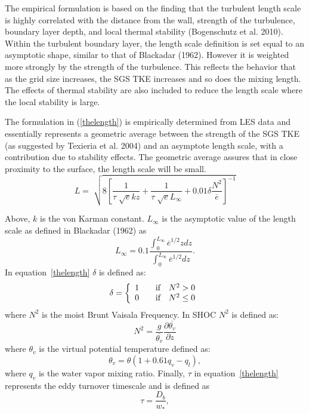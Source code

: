 \documentclass[12pt,titlepage]{article}
\numberwithin{equation}{section}
\begin{document}
The empirical formulation is based on the finding that the turbulent length scale is highly correlated with the distance from the wall, strength of the turbulence, boundary layer depth, and local thermal stability (Bogenschutz et al. 2010).  Within the turbulent boundary layer, the length scale definition is set equal to an asymptotic shape, similar to that of Blackadar (1962).  However it is weighted more strongly by the strength of the turbulence.  This reflects the behavior that as the grid size increases, the SGS TKE increases and so does the mixing length.  The effects of thermal stability are also included to reduce the length scale where the local stability is large.  

The formulation in (\ref{thelength}) is empirically determined from LES data and essentially represents a geometric average between the strength of the SGS TKE (as suggested by Texieria et al. 2004) and an asymptote length scale, with a contribution due to stability effects.  The geometric average assures that in close proximity to the surface, the length scale will be small.  
%
\begin{equation}
  L=\sqrt[]{8\left[\frac{1}{\tau\sqrt[]{e}kz}+\frac{1}{\tau\sqrt[]{e}L_{\infty}}+0.01\delta\frac{N^{2}}{\overline{e}}\right]^{-1}}
  \label{thelength}
\end{equation}

Above, $k$ is the von Karman constant.  $L_{\infty}$ is the asymptotic value of the length scale as defined in Blackadar (1962) as
%
 \begin{equation}
  L_{\infty}=0.1\frac{\int_{0}^{L_{\infty}}\overline{e}^{1/2}z dz}{\int_{0}^{L_{\infty}} \overline{e}^{1/2} dz}. 
  \end{equation}
   In equation~\ref{thelength} $\delta$ is defined as:
\[
\delta = \left\{ 
\begin{array}{l l}
  1 & \quad \text{if} \quad N^{2} > 0 \\
  0 & \quad \text{if} \quad N^{2} \le 0 \\
\end{array} \right.
\]     
%
where $N^{2}$ is the moist Brunt Vaisala Frequency.  In SHOC $N^{2}$ is defined as:
%
\begin{equation}
  N^{2} = \frac{g}{\overline{\theta_{v}}}\frac{\partial{\overline{\theta_{v}}}}{\partial{z}}
  \label{brunt}
\end{equation}
%
where $\theta_{v}$ is the virtual potential temperature defined as:
%
\begin{equation}
  \theta_{v}=\theta(1 + 0.61q_{v} - q_{l}) , 
  \label{thetav}
\end{equation}
%
where $q_{v}$ is the water vapor mixing ratio. 
%
Finally, $\tau$ in equation~\ref{thelength} represents the eddy turnover timescale and is defined as
%
\begin{equation}
  \tau = \frac{D_{b}}{w_{*}},
  \label{conv_scale}
\end{equation} 
\end{document}
